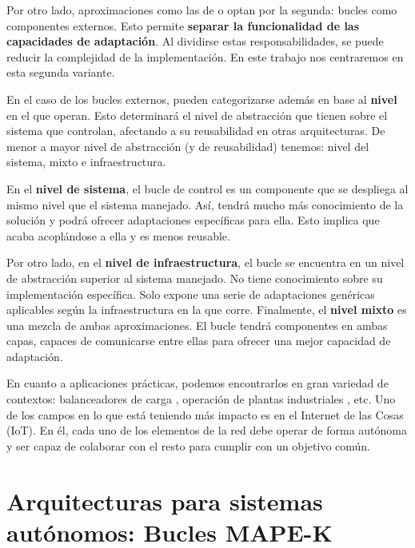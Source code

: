 Por otro lado, aproximaciones como las de \cite{ibmcorporationArchitecturalBlueprintAutonomic2006} o \cite{garlanIncreasingSystemDependability2003} optan por la segunda: bucles como componentes externos. Esto permite \textbf{separar la funcionalidad de las capacidades de adaptación}. Al dividirse estas responsabilidades, se puede reducir la complejidad de la implementación. En este trabajo nos centraremos en esta segunda variante.

En el caso de los bucles externos, pueden categorizarse además en base al \textbf{nivel} en el que operan. \cite{mendoncaGeneralityVsReusability2018} Esto determinará el nivel de abstracción que tienen sobre el sistema que controlan, afectando a su reusabilidad en otras arquitecturas. De menor a mayor nivel de abstracción (y de reusabilidad) tenemos: nivel del sistema, mixto e infraestructura.

En el \textbf{nivel de sistema}, el bucle de control es un componente que se despliega al mismo nivel que el sistema manejado. Así, tendrá mucho más conocimiento de la solución y podrá ofrecer adaptaciones específicas para ella. Esto implica que acaba acoplándose a ella y es menos reusable.

Por otro lado, en el \textbf{nivel de infraestructura}, el bucle se encuentra en un nivel de abstracción superior al sistema manejado. No tiene conocimiento sobre su implementación específica. Solo expone una serie de adaptaciones genéricas aplicables según la infraestructura en la que corre. Finalmente, el \textbf{nivel mixto} es una mezcla de ambas aproximaciones. El bucle tendrá componentes en ambas capas, capaces de comunicarse entre ellas para ofrecer una mejor capacidad de adaptación.

En cuanto a aplicaciones prácticas, podemos encontrarlos en gran variedad de contextos: balanceadores de carga \cite{mishraLoadBalancingCloud2020}, operación de plantas industriales \cite{climentpenadesDissenyPrototipatSolucions2020a}, etc. Uno de los campos en lo que está teniendo más impacto es en el Internet de las Cosas (IoT). \cite{savaglioAgentbasedInternetThings2020} En él, cada uno de los elementos de la red debe operar de forma autónoma y ser capaz de colaborar con el resto para cumplir con un objetivo común.

\section{Arquitecturas para sistemas autónomos: Bucles MAPE-K}
\label{sec:bucles-mapek}

